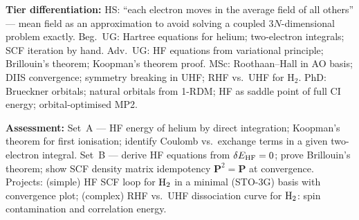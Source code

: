 \documentclass[11pt,a4paper]{article}
\begin{document}
\begin{tcolorbox}[modulebox, title={Module~II.1 --- Lecture L03: Hartree and Hartree--Fock Theory}]
\medskip\textbf{Tier differentiation:}
HS: ``each electron moves in the average field of all others'' --- mean field as an
approximation to avoid solving a coupled 3$N$-dimensional problem exactly.
Beg.\ UG: Hartree equations for helium; two-electron integrals; SCF iteration by hand.
Adv.\ UG: HF equations from variational principle; Brillouin's theorem; Koopman's theorem proof.
MSc: Roothaan--Hall in AO basis; DIIS convergence; symmetry breaking in UHF; RHF vs.\ UHF for H$_2$.
PhD: Brueckner orbitals; natural orbitals from 1-RDM; HF as saddle point of full CI energy;
orbital-optimised MP2.

\medskip\textbf{Assessment:}
Set~A --- HF energy of helium by direct integration; Koopman's theorem for first ionisation;
identify Coulomb vs.\ exchange terms in a given two-electron integral.
Set~B --- derive HF equations from $\delta E_{\rm HF}=0$; prove Brillouin's theorem;
show SCF density matrix idempotency $\mathbf{P}^2=\mathbf{P}$ at convergence.
Projects: (simple) HF SCF loop for $\rm H_2$ in a minimal (STO-3G) basis with convergence plot;
(complex) RHF vs.\ UHF dissociation curve for $\rm H_2$: spin contamination and correlation energy.
\end{tcolorbox}

\medskip
\end{document}
